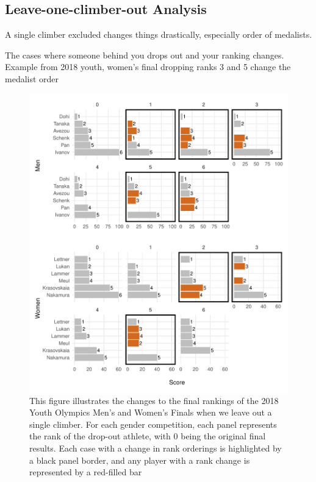 \documentclass[12pt]{article}
\begin{document}
\hypertarget{leave-one-climber-out-analysis}{%
\subsection{Leave-one-climber-out
Analysis}\label{leave-one-climber-out-analysis}}

A single climber excluded changes things drastically, especially order
of medalists.

The cases where someone behind you drops out and your ranking changes.
Example from 2018 youth, women's final dropping ranks 3 and 5 change the
medalist order

\begin{figure}[H]
\centering
\includegraphics{draft_files/figure-latex/unnamed-chunk-13-1.pdf}
\caption{This figure illustrates the changes to the final rankings of
the 2018 Youth Olympics Men's and Women's Finals when we leave out a
single climber. For each gender competition, each panel represents the
rank of the drop-out athlete, with 0 being the original final results.
Each case with a change in rank orderings is highlighted by a black
panel border, and any player with a rank change is represented by a
red-filled bar}
\end{figure}



\end{document}

